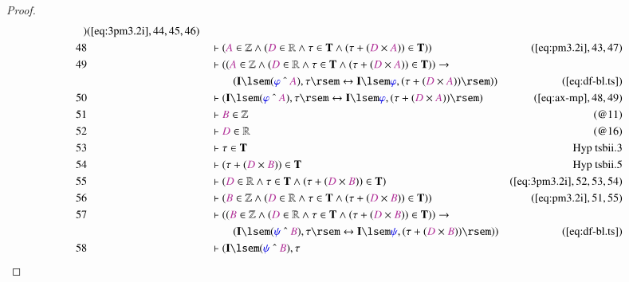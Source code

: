 \begin{proof}
\begin{align}
      )&(\mbox{\ref{eq:3pm3.2i}},44,45,46)\notag
  \\ 48 &&  & \vdash ( \mc{A} \in \mathbb{Z} \wedge ( \mc{D} \in \mathbb{R}
      \wedge \tau \in \mathbf{T} \wedge ( \tau + ( \mc{D}
      \times \mc{A} ) ) \in \mathbf{T} )
      )&(\mbox{\ref{eq:pm3.2i}},43,47)\notag
  \\ 49 &&  & \vdash ( ( \mc{A} \in \mathbb{Z} \wedge ( \mc{D} \in \mathbb{R}
      \wedge \tau \in \mathbf{T} \wedge ( \tau + ( \mc{D}
      \times \mc{A} ) ) \in \mathbf{T} ) ) \rightarrow \notag \\ & & & \qquad
      (
      \mathbf{I} \lsem ( \mw{\varphi} ~\string^~ \mc{A} ) ,
      \tau \rsem \leftrightarrow \mathbf{I} \lsem
      \mw{\varphi} , ( \tau + ( \mc{D} \times \mc{A} ) )
      \rsem ) )&(\mbox{\ref{eq:df-bl.ts}})\notag
  \\ 50 &&  & \vdash ( \mathbf{I} \lsem ( \mw{\varphi} ~\string^~ \mc{A} ) ,
      \tau \rsem \leftrightarrow \mathbf{I} \lsem
      \mw{\varphi} , ( \tau + ( \mc{D} \times \mc{A} ) )
      \rsem )&(\mbox{\ref{eq:ax-mp}},48,49)\notag
  \\ 51 &&  & \vdash \mc{B} \in \mathbb{Z}&(@11)\notag
  \\ 52 &&  & \vdash \mc{D} \in \mathbb{R}&(@16)\notag
  \\ 53 &&  & \vdash \tau \in \mathbf{T}&\text{Hyp~tsbii.3}\notag%
  \\ 54 &&  & \vdash ( \tau + ( \mc{D} \times \mc{B} ) ) \in
      \mathbf{T}&\text{Hyp~tsbii.5}\notag%
  \\ 55 &&  & \vdash ( \mc{D} \in \mathbb{R} \wedge \tau \in \mathbf{T} \wedge
      ( \tau + ( \mc{D} \times \mc{B} ) ) \in \mathbf{T}
      )&(\mbox{\ref{eq:3pm3.2i}},52,53,54)\notag
  \\ 56 &&  & \vdash ( \mc{B} \in \mathbb{Z} \wedge ( \mc{D} \in \mathbb{R}
      \wedge \tau \in \mathbf{T} \wedge ( \tau + ( \mc{D}
      \times \mc{B} ) ) \in \mathbf{T} )
      )&(\mbox{\ref{eq:pm3.2i}},51,55)\notag
  \\ 57 &&  & \vdash ( ( \mc{B} \in \mathbb{Z} \wedge ( \mc{D} \in \mathbb{R}
      \wedge \tau \in \mathbf{T} \wedge ( \tau + ( \mc{D}
      \times \mc{B} ) ) \in \mathbf{T} ) ) \rightarrow  \notag \\ & & & \qquad
     (
      \mathbf{I} \lsem ( \mw{\psi} ~\string^~ \mc{B} ) ,
      \tau \rsem \leftrightarrow \mathbf{I} \lsem \mw{\psi}
      , ( \tau + ( \mc{D} \times \mc{B} ) ) \rsem )
      )&(\mbox{\ref{eq:df-bl.ts}})\notag
  \\ 58 &&  & \vdash ( \mathbf{I} \lsem ( \mw{\psi} ~\string^~ \mc{B} ) , \tau

\end{align}
\end{proof}

